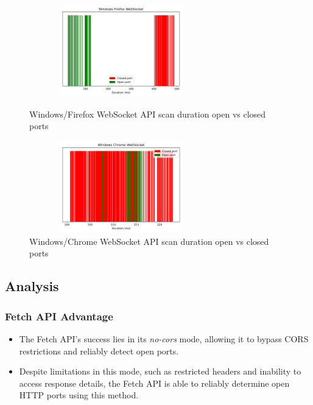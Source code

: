 \begin{figure}[ht]
\centering
\begin{minipage}{.45\textwidth}
  \centering
\includegraphics[width=8cm, height=4cm, keepaspectratio]{port_scanning_techniques/img/windows_Firefox_efficacy_websocket.png}
    \caption{Windows/Firefox WebSocket API scan duration open vs closed ports}
    \label{fig:win-firefox-websocket}
\end{minipage}
\hspace{0.5cm} %
\begin{minipage}{.45\textwidth}
  \centering
\includegraphics[width=8cm, height=4cm, keepaspectratio]{port_scanning_techniques/img/windows_chrome_efficacy_websocket.png}
    \caption{Windows/Chrome WebSocket API scan duration open vs closed ports}
    \label{fig:win-chrome-websocket}
\end{minipage}
\end{figure}

\subsection{Analysis}

\subsubsection{Fetch API Advantage}

\begin{itemize}
    \item The Fetch API's success lies in its \emph{no-cors} mode, allowing it to bypass CORS restrictions and reliably detect open ports.
    \item Despite limitations in this mode, such as restricted headers and inability to access response details, the Fetch API is able to reliably determine open HTTP ports using this method.
\end{itemize}


